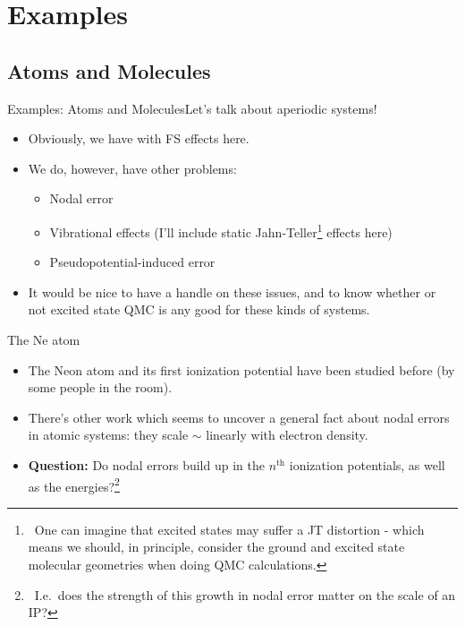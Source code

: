 \documentclass[12pt, pdf, hyperref={draft}, usenames, dvipsnames,
aspectratio=169]{beamer}
\newcommand{\blue}[1]{{\bf\color{NavyBlue}{#1}}}
\newcommand{\green}[1]{{\bf\color{ForestGreen}{#1}}}
\begin{document}

\section{Examples}\label{sec:examples}

\subsection{Atoms and Molecules}\label{sub:atoms_and_molecules}

\begin{frame}{Examples: Atoms and Molecules}{Let's talk about aperiodic
systems!}

\begin{itemize}
  \item Obviously, we have \green{no problem} with FS effects here.
  \item We do, however, \blue{potentially} have other problems:
  \begin{itemize}
    \item Nodal error
    \item Vibrational effects (I'll include static Jahn-Teller\footnote{\ One can
    imagine that excited states may suffer a JT distortion - which means we
    should, in principle, consider the ground and excited state molecular
    geometries when doing QMC calculations.} effects here)
    \item Pseudopotential-induced error
  \end{itemize}

  \item It would be nice to have a handle on these issues, and to know whether
  or not excited state QMC is any good for these kinds of systems.

\end{itemize}
\end{frame}


\begin{frame}{The Ne atom}

\begin{itemize}
  \item The Neon atom and its first ionization potential have been studied
  before (by some people in the room).

  \item There's other work which seems to uncover a general fact about nodal
  errors in atomic systems: they scale $\sim$ linearly with electron
  density.

  \item {\bf Question:} Do nodal errors build up in the $n^{\text{th}}$
  ionization potentials, as well as the energies?\footnote{\ I.e.\ does the
  strength of this growth in nodal error matter on the scale of an IP?}
\end{itemize}
\end{frame}
\end{document}
